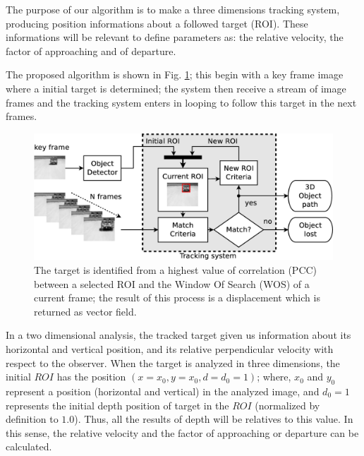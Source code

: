 The purpose of our algorithm is to make a three dimensions tracking system, producing position informations 
about a followed target (ROI).
These informations will be relevant to define parameters 
as: the relative velocity, the factor of approaching and of departure.

The proposed algorithm is shown in Fig. \ref{fig:system};
this begin with a key frame image where a initial target is determined; 
the system then receive a stream of image frames and the tracking system 
enters in looping to follow this target in the next frames.

\begin{figure}[bhp]
\includegraphics[width=\columnwidth]{images/figure1-diagram1.eps}
\caption{The target is identified from a highest value of correlation (PCC) between a selected ROI and 
the Window Of Search (WOS) of a current frame; the result of this process is a displacement which is  returned as vector field.}
\label{fig:system}
\end{figure}

In a two dimensional analysis, the tracked target given us information about its horizontal 
and vertical position, and its relative perpendicular velocity with respect to the observer.
When the target is analyzed in three dimensions, 
the initial $ROI$ has the position $(x=x_0,y=x_0,d=d_0=1)$;
where, $x_0$ and $y_0$ represent a position (horizontal and vertical) in the analyzed image,
and $d_0=1$ represents the initial depth position of target in the $ROI$ (normalized by definition to $1.0$).
Thus, all the results of depth will be relatives to this value. In this sense, the relative velocity and 
the factor of approaching or departure can be calculated.

